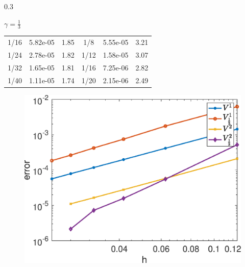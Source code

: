 \documentclass{msuposter}
\newcommand{\colwidth}{0.3\linewidth}
\begin{document}
\begin{frame}{}
\begin{columns}[t]
\begin{column}{\colwidth}
\begin{exampleblock}{$\gamma = 	\frac{1}{3}$}
\begin{table}
\begin{tabular}{|c|ll||c|ll|}
			1/16& 5.82e-05 & 1.85  &1/8 & 5.55e-05 & 3.21\\
			1/24& 2.78e-05 & 1.82  &1/12 & 1.58e-05 & 3.07\\
			1/32& 1.65e-05 & 1.81  &1/16 & 7.25e-06 & 2.82\\
			1/40& 1.11e-05 & 1.74  & 1/20 & 2.15e-06 & 2.49\\
			\hline
		\end{tabular}
	\end{table}
	\begin{figure}
\includegraphics[width=0.5\linewidth]{Figure2}
\end{figure}
\end{exampleblock}
\end{column}
\end{columns}	
\end{frame}
\end{document}
